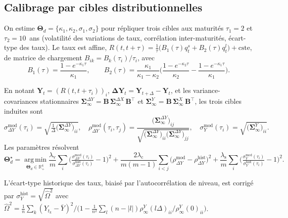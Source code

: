 \documentclass[11pt,a4paper]{article}
\begin{document}
\subsection{Calibrage par cibles distributionnelles}
\label{sec:cibles}
On estime $\bm{\Theta}_d=\{\kappa_1,\kappa_2,\sigma_1,\sigma_2\}$ pour répliquer trois cibles aux maturités $\tau_1=2$ et $\tau_2=10$~ans (volatilité des variations de taux, corrélation inter-maturités, écart-type des taux). Le taux est affine, $R(t,t+\tau)=\tfrac{1}{\tau}\big(B_1(\tau)q_t^{s}+B_2(\tau)q_t^{l}\big)+\text{cste}$, de matrice de chargement $B_{ik}=B_k(\tau_i)/\tau_i$, avec
\[
B_1(\tau)=\frac{1-e^{-\kappa_1\tau}}{\kappa_1},\qquad
B_2(\tau)=\frac{\kappa_1}{\kappa_1-\kappa_2}\Big(\frac{1-e^{-\kappa_2\tau}}{\kappa_2}-\frac{1-e^{-\kappa_1\tau}}{\kappa_1}\Big).
\]
\begin{definitionbox}
En notant $\bm{Y}_t=(R(t,t+\tau_i))_i$, $\bm{\Delta Y}_t=\bm{Y}_{t+\Delta}-\bm{Y}_t$, et les variance-covariances stationnaires $\bm{\Sigma}^{\Delta Y}_\infty=\bm{B}\,\bm{\Sigma}^{\Delta X}_\infty\,\bm{B}^\top$ et $\bm{\Sigma}^{Y}_\infty=\bm{B}\,\bm{\Sigma}^{X}_\infty\,\bm{B}^\top$, les trois cibles induites sont
\[
\sigma^{\mathrm{mod}}_{\Delta Y}(\tau_i)=\sqrt{\tfrac{1}{\Delta}\big(\bm{\Sigma}^{\Delta Y}_\infty\big)_{ii}},\quad
\rho^{\mathrm{mod}}_{\Delta Y}(\tau_i,\tau_j)=\frac{\big(\bm{\Sigma}^{\Delta Y}_\infty\big)_{ij}}{\sqrt{\big(\bm{\Sigma}^{\Delta Y}_\infty\big)_{ii}\big(\bm{\Sigma}^{\Delta Y}_\infty\big)_{jj}}},\quad
\sigma^{\mathrm{mod}}_{Y}(\tau_i)=\sqrt{\big(\bm{\Sigma}^{Y}_\infty\big)_{ii}} .
\]
Les paramètres résolvent
\[
\bm{\Theta}_d^{\star}=\operatorname*{arg\,min}_{\bm{\Theta}_d\in\mathbb{R}_+^4}
\frac{\lambda_{\mathrm{v}}}{m}\sum_{i}\!\Big(\tfrac{\sigma^{\mathrm{mod}}_{\Delta Y}(\tau_i)}{\sigma^{\mathrm{hist}}_{\Delta Y}(\tau_i)}-1\Big)^2
+\frac{2\lambda_{\mathrm{c}}}{m(m-1)}\sum_{i<j}\!\big(\rho^{\mathrm{mod}}_{\Delta Y}-\rho^{\mathrm{hist}}_{\Delta Y}\big)^2
+\frac{\lambda_{\mathrm{s}}}{m}\sum_{i}\!\Big(\tfrac{\sigma^{\mathrm{mod}}_{Y}(\tau_i)}{\sigma^{\mathrm{hist}}_{Y}(\tau_i)}-1\Big)^2 .
\]
\end{definitionbox}
L'écart-type historique des taux, biaisé par l'autocorrélation de niveau, est corrigé par $\sigma^{\mathrm{hist}}_Y=\sqrt{\widehat\Omega^2}$ avec $\widehat\Omega^2=\tfrac{1}{n}\sum_k(Y_{t_k}-\bar Y)^2\big/\big(1-\tfrac{1}{n^2}\sum_{l}(n-|l|)\rho^Y_\infty(l\Delta)_{ii}/\rho^Y_\infty(0)_{ii}\big)$.
\end{document}
